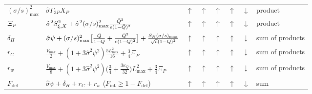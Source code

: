 \begin{table}
\begin{ruledtabular}
\begin{tabular}{p{}p{}ccccc p{}}
$(\sigma/s)^2_{\max}$ & $\hat\sigma\Gamma_{3P}X_P$ & $\uparrow$ & $\uparrow$ & $\uparrow$ & $\uparrow$ & $\downarrow$ & product\\
$\Xi_P$ & $\hat\sigma^2S_{\xi,X}^2+\hat\sigma^2(\sigma/s)^2_{\max}\frac{\bar Q^2}{e(1-\bar Q)^2}$ & $\uparrow$ & $\uparrow$ & $\uparrow$ & $\uparrow$ & $\downarrow$ & product\\
$\delta_H$ & $\hat\sigma\psi+(\sigma/s)^2_{\max}\big[\frac{\bar Q}{1-\bar Q}+\frac{\bar Q^2}{e(1-\bar Q)^2}\big]+\frac{S_N(\sigma/s)_{\max}}{\sqrt e(1-\bar Q)^2}$ & $\uparrow$ & $\uparrow$ & $\uparrow$ & $\uparrow$ & $\downarrow$ & sum of products\\
$r_C$ & $\frac{V_{\max}}2+(1+3\hat\sigma^2\psi^2)\frac{5L^2_{\max}}{16}+\frac34\Xi_P$ & $\uparrow$ & $\uparrow$ & $\uparrow$ & $\uparrow$ & $\downarrow$ & sum of products\\
$r_w$ & $\frac{V_{\max}}8+(1+3\hat\sigma^2\psi^2)\big(\frac34+\frac{3\kappa_Q}{32}\big)L^2_{\max}+\frac34\Xi_P$ & $\uparrow$ & $\uparrow$ & $\uparrow$ & $\uparrow$ & $\downarrow$ & sum of products\\
$F_{\mathrm{def}}$ & $\hat\sigma\psi+\delta_H+r_C+r_w$ ($F_{\mathrm{int}}\ge1-F_{\mathrm{def}}$) & $\uparrow$ & $\uparrow$ & $\uparrow$ & $\uparrow$ & $\downarrow$ & sum\\
\end{tabular}
\end{ruledtabular}
\end{table}

